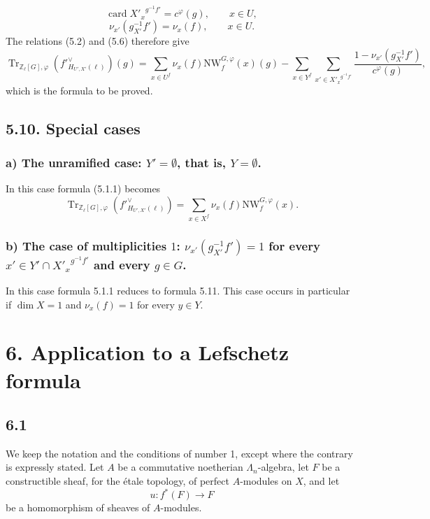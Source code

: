 \documentclass[11pt]{article}
\providecommand{\Tr}{\operatorname{Tr}}
\providecommand{\Tr}{\operatorname{Tr}}
\providecommand{\Tr}{\operatorname{Tr}}
\providecommand{\Tr}{\operatorname{Tr}}
\providecommand{\La}{\Lambda}
\providecommand{\bZ}{\mathbb Z}
\providecommand{\card}{\operatorname{card}}
\providecommand{\Tr}{\operatorname{Tr}}
\begin{document}
\begin{equation}\tag{5.7}
\card {X'_x}^{g^{-1}f'}=c^\varphi(g),
\qquad x\in U,
\end{equation}
\begin{equation}\tag{5.8}
\nu_{x'}(g^{-1}_{X'}f')=\nu_x(f),
\qquad x\in U.
\end{equation}
The relations (5.2) and (5.6) therefore give
\begin{equation}\tag{5.9}
\Tr_{\bZ_\ell[G],\varphi}(f'^\vee_{H_{U',X'}(\ell)})(g)
=
\sum_{x\in U^f}\nu_x(f)\mathrm{NW}_f^{G,\varphi}(x)(g)
-
\sum_{x\in Y^f}\sum_{x'\in {X'_x}^{g^{-1}f'}}
\frac{1-\nu_{x'}(g^{-1}_{X'}f')}{c^\varphi(g)},
\end{equation}
which is the formula to be proved.

\subsection*{5.10. Special cases}
\subsubsection*{a) The unramified case: $Y'=\emptyset$, that is, $Y=\emptyset$.}
In this case formula (5.1.1) becomes
\begin{equation}\tag{5.11}
\Tr_{\bZ_\ell[G],\varphi}(f'^\vee_{H_{U',X'}(\ell)})
=
\sum_{x\in X^f}\nu_x(f)\mathrm{NW}_f^{G,\varphi}(x).
\end{equation}

\subsubsection*{b) The case of multiplicities $1$: $\nu_{x'}(g^{-1}_{X'}f')=1$ for every $x'\in Y'\cap {X'_x}^{g^{-1}f'}$ and every $g\in G$.}
In this case formula 5.1.1 reduces to formula 5.11. This case occurs in particular if $\dim X=1$ and $\nu_x(f)=1$ for every $y\in Y$.

\section*{6. Application to a Lefschetz formula}

\subsection*{6.1}
We keep the notation and the conditions of number 1, except where the contrary is expressly stated. Let $A$ be a commutative noetherian $\La_n$-algebra, let $F$ be a constructible sheaf, for the étale topology, of perfect $A$-modules on $X$, and let
\[
u:f^*(F)\longrightarrow F
\]
be a homomorphism of sheaves of $A$-modules.
\end{document}
